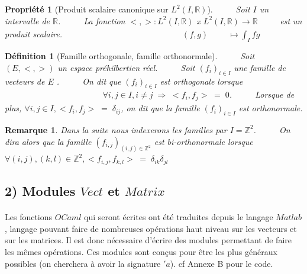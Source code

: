 \documentclass[a4paper,10pt]{report}
\theoremstyle{break}
\newtheorem{Def}{D\'{e}finition}
\newtheorem{Prop}{Propri\'{e}t\'{e}}
\newtheorem{Rem}{Remarque}
\begin{document}
	
    \begin{Prop}[Produit scalaire canonique sur $L^2(I,\mathbb{R})$]
	$\phantom{Prop}$ Soit $I$ un intervalle de $\mathbb{R}$. \newline
	$\phantom{Prop}$ La fonction $ <,> : L^2(I,\mathbb{R}) $ x $L^2(I,\mathbb{R}) \rightarrow \mathbb{R} \phantom{\int_{I} fg} $ est un produit scalaire.\newline
	$\phantom{Prop}$ $\phantom{La fonction <,> : L^2(I,R} (f, g) \phantom{L^2(I,} \mapsto \int_{I} fg$
    \end{Prop}
	
    
    \begin{Def}[Famille orthogonale, famille orthonormale]
	$\phantom{Prop}$ Soit $(E, <,>)$ un espace pr\'{e}hilbertien r\'{e}el. \newline
	$\phantom{Prop}$ Soit $(f_i)_{i \in I}$ une famille de vecteurs de $E$ . \newline
	$\phantom{Prop}$ On dit que $(f_i)_{i \in I}$ est orthogonale lorsque \newline
	$\phantom{Prop On dit que (f_i)_{i \in I} est}$ $\forall i, j \in I, i \neq j \; \Rightarrow \; <f_i, f_j> \; = \; 0$. \newline
	$\phantom{Prop}$ Lorsque de plus, $\forall i, j \in I, <f_i,f_j> \; = \; \delta_{ij}$, on dit que la famille $(f_i)_{i \in I}$ est orthonormale.
    \end{Def}
    
    \begin{Rem} Dans la suite nous indexerons les familles par $I = \mathbb{Z}^2 $.\newline
	$\phantom{Prop}$ On dira alors que la famille $ (f_{i,j})_{(i,j) \in  \mathbb{Z}^2 } $ est bi-orthonormale lorsque \newline
	$\phantom{Prop}$ $\forall (i, j), (k, l) \in  \mathbb{Z}^2, <f_{i,j}, f_{k,l}> \; = \; \delta_{ik} \delta_{jl}$
    \end{Rem}
	
\newpage
	
  \subsection*{2) Modules $Vect$ et $Matrix$}
  
    \paragraph{} Les fonctions $OCaml$ qui seront \'{e}crites ont \'{e}t\'{e} traduites depuis le langage $Matlab$, langage 
	pouvant faire de nombreuses op\'{e}rations haut niveau sur les vecteurs et sur les matrices. Il est donc n\'{e}cessaire
	d'\'{e}crire des modules permettant de faire les m\^{e}mes op\'{e}rations. Ces modules sont con{\c c}us pour \^{e}tre les plus
	g\'{e}n\'{e}raux possibles (on cherchera \`{a} avoir la signature $'a$). cf Annexe B pour le code.
	
\end{document}
